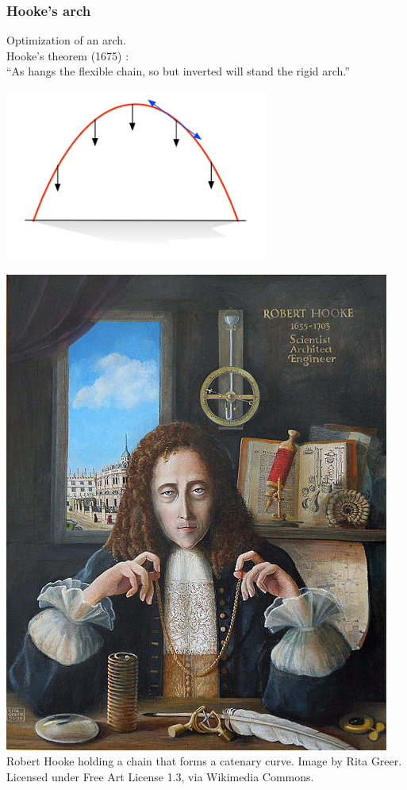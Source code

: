 \documentclass[12pt]{beamer}
\begin{document}
\begin{frame}
\frametitle{Hooke's arch}
\begin{minipage}{0.4\textwidth}
Optimization of an arch.\\
Hooke's theorem (1675) :\\
``As hangs the flexible chain, so but inverted will stand the rigid arch.''
\\
\begin{center}
\includegraphics[width=0.65\textwidth]{arche.png}
\end{center}
\end{minipage}
\hfill
\begin{minipage}{0.4\textwidth}
\includegraphics[width=\textwidth]{Robert-Hooke.jpeg} \\
{\tiny 
Robert Hooke holding a chain that forms a catenary curve. 
Image by Rita Greer. Licensed under Free Art License 1.3, via Wikimedia Commons.}
\end{minipage}
\end{frame}
\end{document}
